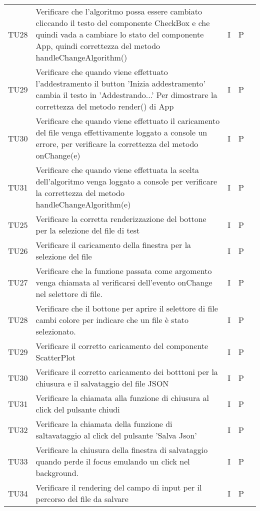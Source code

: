 \begin{longtable} {
		>{}p{15mm} 
		>{}p{79.5mm}
		>{}p{15mm} 
		>{}p{15mm}
		>{}p{0mm}}
	TU28	& Verificare che l'algoritmo possa essere cambiato cliccando il testo del componente CheckBox e che quindi vada a cambiare lo stato del componente App, quindi correttezza del metodo handleChangeAlgorithm() & I & P &\TBstrut \\ [2mm]
	TU29	& Verificare che quando viene effettuato l'addestramento il button 'Inizia addestramento' cambia il testo in 'Addestrando...' Per dimostrare la correttezza del metodo render() di App & I & P &\TBstrut \\ [2mm]
	TU30	& Verificare che quando viene effettuato il caricamento del file venga effettivamente loggato a console un errore, per verificare la correttezza del metodo onChange(e) & I & P &\TBstrut \\ [2mm]
	TU31	& Verificare che quando viene effettuata la scelta dell'algoritmo venga loggato a console per verificare la correttezza del metodo handleChangeAlgorithm(e) & I & P &\TBstrut \\ [2mm]
	TU25	& Verificare la corretta renderizzazione del bottone per la selezione del file di test & I & P &\TBstrut \\ [2mm]
	TU26	& Verificare il caricamento della finestra per la selezione del file & I & P &\TBstrut \\ [2mm]
	TU27	& Verificare che la funzione passata come argomento venga chiamata al verificarsi dell'evento onChange nel selettore di file. & I & P &\TBstrut \\ [2mm]
	TU28	& Verificare che il bottone per aprire il selettore di file cambi colore per indicare che un file è stato selezionato. & I & P &\TBstrut \\ [2mm]
	TU29	& Verificare il corretto caricamento del componente ScatterPlot & I & P &\TBstrut \\ [2mm]
	TU30	& Verificare il corretto caricamento dei botttoni per la chiusura e il salvataggio del file JSON & I & P &\TBstrut \\ [2mm]
	TU31	& Verificare la chiamata alla funzione di chiusura al click del pulsante chiudi & I & P &\TBstrut \\ [2mm]
	TU32	& Verificare la chiamata della funzione di saltavataggio al click del pulsante 'Salva Json' & I & P &\TBstrut \\ [2mm]
	TU33	& Verificare la chiusura della finestra di salvataggio quando perde il focus emulando un click nel background. & I & P &\TBstrut \\ [2mm]
	TU34	& Verificare il rendering del campo di input per il percorso del file da salvare & I & P &\TBstrut \\ [2mm]

\end{longtable}
